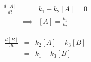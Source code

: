 \documentclass{article}
\begin{document}
\begin{eqnarray*}
 \frac{d\left[ A \right]}{dt} & = & k_1 - k_2 \left[ A \right] = 0\\
 & \implies & \left[ A \right] = \frac{k_1}{k_2}
\end{eqnarray*}

\begin{eqnarray*}
 \frac{d \left[ B \right]}{dt} & = & k_2 \left[A\right] - k_3 \left[ B \right]\\
 & = & k_1 - k_3 \left[ B \right]
 \end{eqnarray*}
\end{document}
